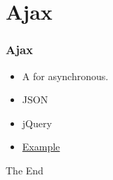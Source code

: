\documentclass{beamer}
\begin{document}
\section{Ajax}
\begin{frame}[fragile]
	\frametitle{Ajax}
	\begin{itemize}
		\item A for asynchronous.
		\item JSON
		\item jQuery
		\item
		\href{https://simpleisbetterthancomplex.com/tutorial/2016/08/29/how-to-work-with-ajax-request-with-django.html}{Example}
		
	\end{itemize}
\end{frame}



\begin{frame}
\Huge \centering The End
\end{frame}
\end{document}
